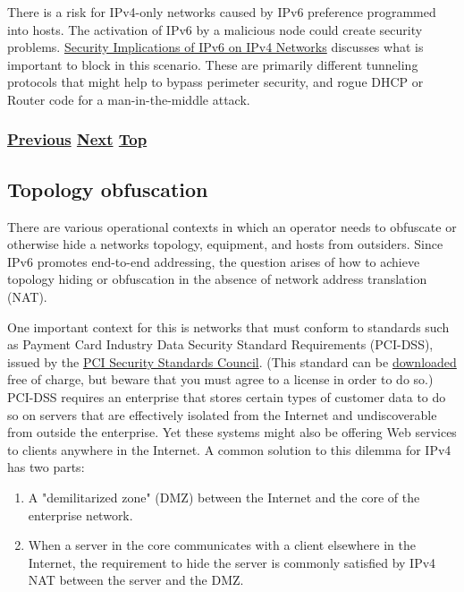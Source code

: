 \documentclass[
]{article}
\begin{document}
There is a risk for IPv4-only networks caused by IPv6 preference
programmed into hosts. The activation of IPv6 by a malicious node could
create security problems.
\href{https://www.rfc-editor.org/info/rfc7123}{Security Implications of
IPv6 on IPv4 Networks} discusses what is important to block in this
scenario. These are primarily different tunneling protocols that might
help to bypass perimeter security, and rogue DHCP or Router code for a
man-in-the-middle attack.

\subsubsection{\texorpdfstring{\hyperref[layer-2-considerations]{Previous}
\hyperref[topology-obfuscation]{Next}
\hyperref[security]{Top}}{Previous Next Top}}\label{previous-next-top-20}

\pagebreak

\subsection{Topology obfuscation}\label{topology-obfuscation}

There are various operational contexts in which an operator needs to
obfuscate or otherwise hide a network\textquotesingle s topology,
equipment, and hosts from outsiders. Since IPv6 promotes end-to-end
addressing, the question arises of how to achieve topology hiding or
obfuscation in the absence of network address translation (NAT).

One important context for this is networks that must conform to
standards such as Payment Card Industry Data Security Standard
Requirements (PCI-DSS), issued by the
\href{https://www.pcisecuritystandards.org}{PCI Security Standards
Council}. (This standard can be
\href{https://docs-prv.pcisecuritystandards.org/PCI\%20DSS/Standard/PCI-DSS-v4_0.pdf}{downloaded}
free of charge, but beware that you must agree to a license in order to
do so.) PCI-DSS requires an enterprise that stores certain types of
customer data to do so on servers that are effectively isolated from the
Internet and undiscoverable from outside the enterprise. Yet these
systems might also be offering Web services to clients anywhere in the
Internet. A common solution to this dilemma for IPv4 has two parts:

\begin{enumerate}
\def\labelenumi{\arabic{enumi}.}
\item
  A "demilitarized zone" (DMZ) between the Internet and the core of the
  enterprise network.
\item
  When a server in the core communicates with a client elsewhere in the
  Internet, the requirement to hide the server is commonly satisfied by
  IPv4 NAT between the server and the DMZ.
\end{enumerate}
\end{document}
